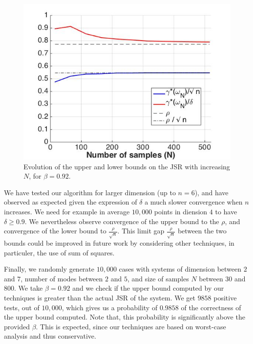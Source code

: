 \begin{figure}
\begin{center}
\includegraphics[trim = 5mm 5mm 5mm 5mm,scale=0.35]{bounds1.jpg}

\caption{Evolution of the upper and lower bounds on the JSR with increasing $N$, for $\beta=0.92$.}
\label{fig:21}
\end{center}
\end{figure}

We have tested our algorithm for larger dimension (up to $n=6$), and have observed as expected given the expression of $\delta$ a much slower convergence when $n$ increases. We need for example in average $10,000$ points in diension $4$ to have $\delta \geq 0.9$. We nevertheless observe convergence of the upper bound to the $\rho$, and convergence of the lower bound to $\frac{\rho}{\sqrt{n}}$. This limit gap $\frac{\rho}{\sqrt{n}}$ between the two bounds could be improved in future work by considering other techniques, in particuler, the use of sum of squares.

Finally, we randomly generate $10,000$ cases with systems of dimension between $2$ and $7$, number of modes between $2$ and $5$, and size of samples $N$ between $30$ and $800$. We take $\beta = 0.92$ and we check if the upper bound computed by our techniques is greater than the actual JSR of the system. We get $9858$ positive tests, out of $10,000$, which gives us a probability of $0.9858$ of the correctness of the upper bound computed. Note that, this probability is significantly above the provided $\beta$. This is expected, since our techniques are based on worst-case analysis and thus conservative.



